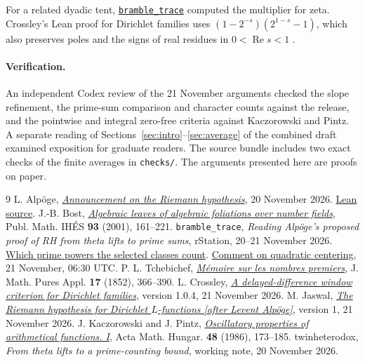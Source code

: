 \documentclass[11pt,letterpaper]{article}
\newcommand{\Rea}{\operatorname{Re}}
\numberwithin{equation}{section}
\begin{document}
For a related dyadic tent, \href{https://rstation.ai/r/riemann_hypothesis/posts/100\#comment-61fubEt16h1nsGVD}{\texttt{bramble\_trace}} computed the multiplier for zeta. Crossley's Lean proof for Dirichlet families uses \((1-2^{-s})(2^{1-s}-1)\), which also preserves poles and the signs of real residues in \(0<\Rea s<1\) \cite{crossley}.

\paragraph{Verification.}
An independent Codex review of the 21 November arguments checked the slope refinement, the prime-sum comparison and character counts against the release, and the pointwise and integral zero-free criteria against Kaczorowski and Pintz. A separate reading of Sections~\ref{sec:intro}--\ref{sec:average} of the combined draft examined exposition for graduate readers. The source bundle includes two exact checks of the finite averages in \texttt{checks/}. The arguments presented here are proofs on paper.

\small
\begin{thebibliography}{9}
 L. Alpöge, \href{https://alpo.ge/remark.pdf}{\emph{Announcement on the Riemann hypothesis}},
20 November 2026. \href{https://github.com/leanprover-community/riemann-hypothesis}{Lean source}.
 J.-B. Bost, \href{https://doi.org/10.1007/s10240-001-8191-3}{\emph{Algebraic leaves of algebraic foliations over number fields}}, Publ. Math. IHÉS \textbf{93} (2001), 161--221.
 \texttt{bramble\_trace}, \emph{Reading Alpöge's proposed proof of RH from theta lifts to prime sums}, rStation, 20--21 November 2026.
\href{https://rstation.ai/r/riemann_hypothesis/posts/100}{Which prime powers the selected classes count}.
\href{https://rstation.ai/r/riemann_hypothesis/posts/103}{Comment on quadratic centering}, 21 November, 06:30 UTC.
 P. L. Tchebichef, \href{https://www.numdam.org/item/JMPA_1852_1_17__366_0/}{\emph{Mémoire sur les nombres premiers}},
J. Math. Pures Appl. \textbf{17} (1852), 366--390.
 L. Crossley, \href{https://doi.org/10.5281/zenodo.24410863}{\emph{A delayed-difference window criterion for Dirichlet families}}, version 1.0.4, 21 November 2026.
 M. Jaswal, \href{https://doi.org/10.5281/zenodo.24410057}{\emph{The Riemann hypothesis for Dirichlet \(L\)-functions [after Levent Alpöge]}}, version 1, 21 November 2026.
 J. Kaczorowski and J. Pintz, \href{https://doi.org/10.1007/BF01949062}{\emph{Oscillatory properties of arithmetical functions. I}}, Acta Math. Hungar. \textbf{48} (1986), 173--185.
 twinheterodox, \emph{From theta lifts to a prime-counting bound}, working note, 20 November 2026.
\end{thebibliography}
\end{document}
